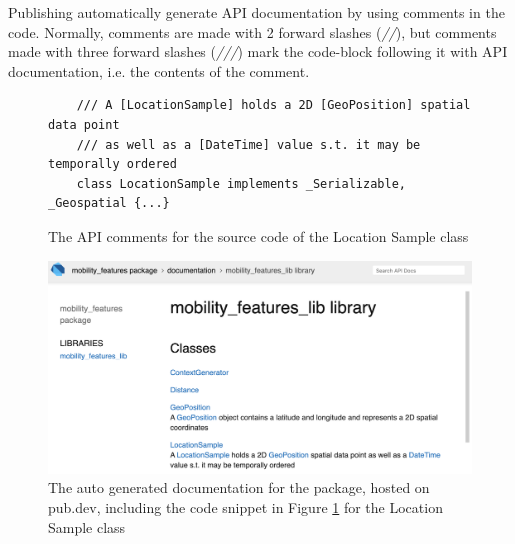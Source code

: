Publishing automatically generate API documentation by using comments in the code. Normally, comments are made with 2 forward slashes (\textit{//}), but comments made with three forward slashes (\textit{///}) mark the code-block following it with API documentation, i.e. the contents of the comment. 

\begin{figure}
    \centering
    \begin{verbatim}
    /// A [LocationSample] holds a 2D [GeoPosition] spatial data point
    /// as well as a [DateTime] value s.t. it may be temporally ordered
    class LocationSample implements _Serializable, _Geospatial {...}
    \end{verbatim}
    \caption{The API comments for the source code of the Location Sample class}
    \label{fig:api-comments}
\end{figure}

\begin{figure}
    \centering
    \includegraphics[width=\textwidth]{images/docs.png}
    \caption{The auto generated documentation for the package, hosted on pub.dev, including the code snippet in Figure \ref{fig:api-comments} for the Location Sample class}
    \label{fig:api-docs}
\end{figure}


